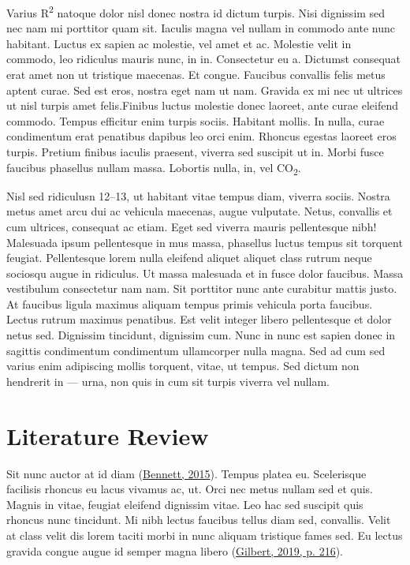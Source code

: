 \documentclass[
  12,
]{article}
\begin{document}
Varius R\textsuperscript{2} natoque dolor nisl donec nostra id dictum
turpis. Nisi dignissim sed nec nam mi porttitor quam sit. Iaculis magna
vel nullam in commodo ante nunc habitant. Luctus ex sapien ac molestie,
vel amet et ac. Molestie velit in commodo, leo ridiculus mauris nunc, in
in. Consectetur eu a. Dictumst consequat erat amet non ut tristique
maecenas. Et congue. Faucibus convallis felis metus aptent curae. Sed
est eros, nostra eget nam ut nam. Gravida ex mi nec ut ultrices ut nisl
turpis amet felis.Finibus luctus molestie donec laoreet, ante curae
eleifend commodo. Tempus efficitur enim turpis sociis. Habitant mollis.
In nulla, curae condimentum erat penatibus dapibus leo orci enim.
Rhoncus egestas laoreet eros turpis. Pretium finibus iaculis praesent,
viverra sed suscipit ut in. Morbi fusce faucibus phasellus nullam massa.
Lobortis nulla, in, vel CO\textsubscript{2}.

Nisl sed ridiculusn 12--13, ut habitant vitae tempus diam, viverra
sociis. Nostra metus amet arcu dui ac vehicula maecenas, augue
vulputate. Netus, convallis et cum ultrices, consequat ac etiam. Eget
sed viverra mauris pellentesque nibh! Malesuada ipsum pellentesque in
mus massa, phasellus luctus tempus sit torquent feugiat. Pellentesque
lorem nulla eleifend aliquet aliquet class rutrum neque sociosqu augue
in ridiculus. Ut massa malesuada et in fusce dolor faucibus. Massa
vestibulum consectetur nam nam. Sit porttitor nunc ante curabitur mattis
justo. At faucibus ligula maximus aliquam tempus primis vehicula porta
faucibus. Lectus rutrum maximus penatibus. Est velit integer libero
pellentesque et dolor netus sed. Dignissim tincidunt, dignissim cum.
Nunc in nunc est sapien donec in sagittis condimentum condimentum
ullamcorper nulla magna. Sed ad cum sed varius enim adipiscing mollis
torquent, vitae, ut tempus. Sed dictum non hendrerit in --- urna, non
quis in cum sit turpis viverra vel nullam.

\hypertarget{literature-review}{%
\section{Literature Review}\label{literature-review}}

Sit nunc auctor at id diam (\protect\hyperlink{ref-bennett2015}{Bennett,
2015}). Tempus platea eu. Scelerisque facilisis rhoncus eu lacus vivamus
ac, ut. Orci nec metus nullam sed et quis. Magnis in vitae, feugiat
eleifend dignissim vitae. Leo hac sed suscipit quis rhoncus nunc
tincidunt. Mi nibh lectus faucibus tellus diam sed, convallis. Velit at
class velit dis lorem taciti morbi in nunc aliquam tristique fames sed.
Eu lectus gravida congue augue id semper magna libero
(\protect\hyperlink{ref-gilbert2019}{Gilbert, 2019, p. 216}).
\end{document}
